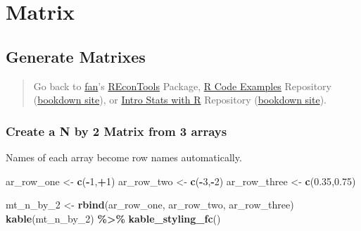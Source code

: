 \documentclass[
]{book}
\newenvironment{Shaded}{\begin{snugshade}}{\end{snugshade}}
\newcommand{\DecValTok}[1]{\textcolor[rgb]{0.00,0.00,0.81}{#1}}
\newcommand{\FloatTok}[1]{\textcolor[rgb]{0.00,0.00,0.81}{#1}}
\newcommand{\KeywordTok}[1]{\textcolor[rgb]{0.13,0.29,0.53}{\textbf{#1}}}
\newcommand{\NormalTok}[1]{#1}
\newcommand{\OperatorTok}[1]{\textcolor[rgb]{0.81,0.36,0.00}{\textbf{#1}}}
\newcommand{\StringTok}[1]{\textcolor[rgb]{0.31,0.60,0.02}{#1}}
\begin{document}
\hypertarget{matrix}{%
\section{Matrix}\label{matrix}}

\hypertarget{generate-matrixes}{%
\subsection{Generate Matrixes}\label{generate-matrixes}}

\begin{quote}
Go back to \href{http://fanwangecon.github.io/}{fan}'s \href{https://fanwangecon.github.io/REconTools/}{REconTools} Package, \href{https://fanwangecon.github.io/R4Econ/}{R Code Examples} Repository (\href{https://fanwangecon.github.io/R4Econ/bookdown}{bookdown site}), or \href{https://fanwangecon.github.io/Stat4Econ/}{Intro Stats with R} Repository (\href{https://fanwangecon.github.io/Stat4Econ/bookdown}{bookdown site}).
\end{quote}

\hypertarget{create-a-n-by-2-matrix-from-3-arrays}{%
\subsubsection{Create a N by 2 Matrix from 3 arrays}\label{create-a-n-by-2-matrix-from-3-arrays}}

Names of each array become row names automatically.

\begin{Shaded}
\begin{Highlighting}[]
\NormalTok{ar\_row\_one \textless{}{-}}\StringTok{ }\KeywordTok{c}\NormalTok{(}\OperatorTok{{-}}\DecValTok{1}\NormalTok{,}\OperatorTok{+}\DecValTok{1}\NormalTok{)}
\NormalTok{ar\_row\_two \textless{}{-}}\StringTok{ }\KeywordTok{c}\NormalTok{(}\OperatorTok{{-}}\DecValTok{3}\NormalTok{,}\OperatorTok{{-}}\DecValTok{2}\NormalTok{)}
\NormalTok{ar\_row\_three \textless{}{-}}\StringTok{ }\KeywordTok{c}\NormalTok{(}\FloatTok{0.35}\NormalTok{,}\FloatTok{0.75}\NormalTok{)}

\NormalTok{mt\_n\_by\_}\DecValTok{2}\NormalTok{ \textless{}{-}}\StringTok{ }\KeywordTok{rbind}\NormalTok{(ar\_row\_one, ar\_row\_two, ar\_row\_three)}
\KeywordTok{kable}\NormalTok{(mt\_n\_by\_}\DecValTok{2}\NormalTok{) }\OperatorTok{\%\textgreater{}\%}
\StringTok{  }\KeywordTok{kable\_styling\_fc}\NormalTok{()}
\end{Highlighting}
\end{Shaded}
\end{document}
